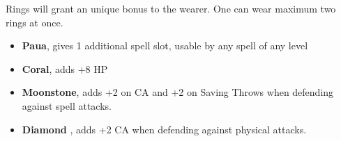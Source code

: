 
Rings will grant an unique bonus to the wearer. One can wear maximum two rings at once.
\begin{itemize}


    \item \textbf{Paua},  gives 1 additional spell slot, usable by any spell of any level

  \item \textbf{Coral}, adds +8 HP

  \item \textbf{Moonstone}, adds +2 on CA and +2 on Saving Throws when defending against spell attacks.

  \item \textbf{Diamond} , adds +2 CA when defending against physical attacks.

\end{itemize}
\pagebreak